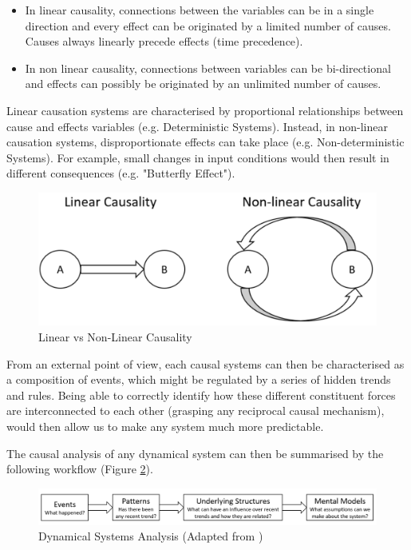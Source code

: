 \vspace{-0.6cm}
\begin{itemize}
    \setlength\itemsep{-0.5em}
    \item In linear causality, connections between the variables can be in a single direction and every effect can be originated by a limited number of causes. Causes always linearly precede effects (time precedence).
    \item In non linear causality, connections between variables can be bi-directional and effects can possibly be originated by an unlimited number of causes.
\end{itemize}
\vspace{-0.6cm}
Linear causation systems are characterised by proportional relationships between cause and effects variables (e.g. Deterministic Systems). Instead, in non-linear causation systems, disproportionate effects can take place (e.g. Non-deterministic Systems). For example, small changes in input conditions would then result in different consequences (e.g. "Butterfly Effect").
\vspace{-0.1cm}
\begin{figure}[ht!]%
    \centering
    \includegraphics[width=0.7\linewidth]{latex/images/linear.pdf}
    \vspace{-0.2cm}
    \caption{Linear vs Non-Linear Causality}
    \label{wow}
\end{figure}
\vspace{-0.5cm}

From an external point of view, each causal systems can then be characterised as a composition of events, which might be regulated by a series of hidden trends and rules. Being able to correctly identify how these different constituent forces are interconnected to each other (grasping any reciprocal causal mechanism), would then allow us to make any system much more predictable. 

The causal analysis of any dynamical system can then be summarised by the following workflow (Figure \ref{wow2}). 

\begin{figure}[ht!]%
    \centering
    \includegraphics[width=1\linewidth]{latex/images/discover.pdf}
    \vspace{-0.6cm}
    \caption{Dynamical Systems Analysis (Adapted from \cite{system})}
    \label{wow2}
\end{figure}
\vspace{-0.5cm}

